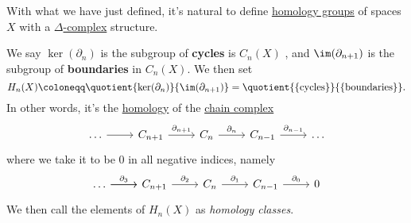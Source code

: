 With what we have just defined, it's natural to define \hyperref[def:homology-group]{homology groups} of spaces \(X\) with a \hyperref[def:delta-complex]{\(\Delta \)-complex}
structure.
\begin{definition}\label{def:homology-class}
	We say \(\ker  (\partial _{n} )\) is the subgroup of \textbf{cycles} is \(C_{n} (X)\) , and \(\im (\partial_{n+1}) \) is the subgroup of \textbf{boundaries}
	in \(C_{n} (X)\). We then set
	\[
		H_{n} (X)\coloneqq \quotient{\ker  (\partial _{n} )}{\im  (\partial _{n+1})} = \quotient{\{\text{cycles}\}}{\{\text{boundaries}\}}.
	\]
	In other words, it's the \hyperref[def:homology-group]{homology} of the \hyperref[def:chain-complex]{chain complex}
	\[
		\begin{tikzcd}
			\ldots & {C_{n+1}} & {C_{n}} & {C_{n-1}} & \ldots
			\arrow[from=1-1, to=1-2]
			\arrow["{\partial_{n+1}}", from=1-2, to=1-3]
			\arrow["{\partial_{n}}", from=1-3, to=1-4]
			\arrow["{\partial_{n-1}}", from=1-4, to=1-5]
		\end{tikzcd}
	\]
	where we take it to be \(0\) in all negative indices, namely
	\[
		\begin{tikzcd}
			\ldots & {C_{n+1}} & {C_{n}} & {C_{n-1}} & 0
			\arrow[from=1-1, to=1-2]
			\arrow["{\partial_{3}}", from=1-1, to=1-2]
			\arrow["{\partial_{2}}", from=1-2, to=1-3]
			\arrow["{\partial_{1}}", from=1-3, to=1-4]
			\arrow["{\partial_{0}}", from=1-4, to=1-5]
		\end{tikzcd}
	\]
	We then call the elements of \(H_{n} (X)\) as \emph{homology classes}.
\end{definition}
